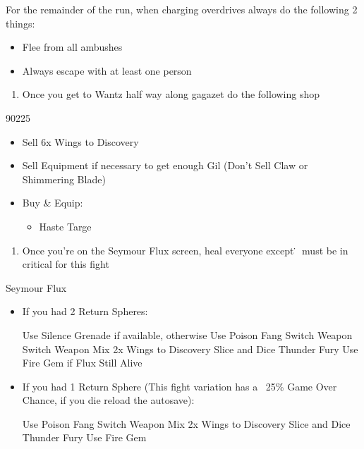 \begin{encounters}
	For the remainder of the run, when charging overdrives always do the following 2 things:
	\begin{itemize}
		\item Flee from all ambushes
		\item Always escape with at least one person
	\end{itemize}
\end{encounters}
\begin{enumerate}[resume]
	\item Once you get to Wantz half way along gagazet do the following shop
\end{enumerate}
\begin{shop}{90225}
	\begin{itemize}
		\item Sell 6x Wings to Discovery
		\item Sell Equipment if necessary to get enough Gil (Don't Sell Claw or Shimmering Blade)
		\item Buy \& Equip:
		\begin{itemize}
			\item Haste Targe
		\end{itemize}
	\end{itemize}
\end{shop}
\begin{enumerate}[resume]
	\item Once you're on the Seymour Flux screen, heal everyone except \rikku\. \rikku\ must be in critical for this fight
\end{enumerate}
\begin{battle}[70000]{Seymour Flux}
	\begin{itemize}
		\item If you had 2 Return Spheres:
			\begin{itemize}
				\rikkuf Use Silence Grenade if available, otherwise Use Poison Fang
				\tidusf Switch Weapon
				\luluf Switch Weapon
				\rikkuf Mix 2x Wings to Discovery
				\tidusf Slice and Dice
				\luluf Thunder Fury
				\rikkuf Use Fire Gem if Flux Still Alive
			\end{itemize}
		\item If you had 1 Return Sphere (This fight variation has a ~25\% Game Over Chance, if you die reload the autosave):
			\begin{itemize}
				\rikkuf Use Poison Fang
				\tidusf Switch Weapon
				\rikkuf Mix 2x Wings to Discovery
				\tidusf Slice and Dice
				\luluf Thunder Fury
				\rikkuf Use Fire Gem
			\end{itemize}
	\end{itemize}
\end{battle}
